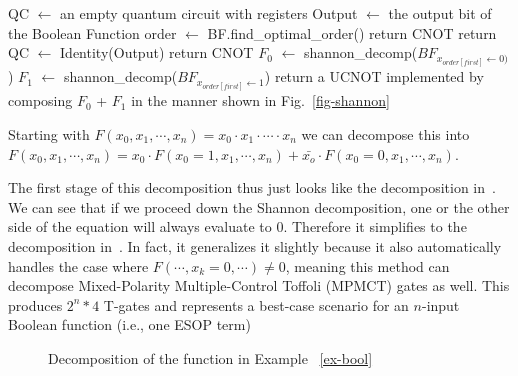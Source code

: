 \begin{algorithm}[tbp]
  \caption{shannon\_decomp(BF: a Boolean function)}
  \label{algo-shannon}
  \begin{algorithmic}
    \State QC $\leftarrow$ an empty quantum circuit with registers
    \State Output $\leftarrow$ the output bit of the Boolean Function
    \State order $\leftarrow$ BF.find\_optimal\_order()
    \State return CNOT
    \State return QC $\leftarrow$ Identity(Output)
    \State return CNOT
    \Else
    \State $F_0$ $\leftarrow$ shannon\_decomp($BF_{x_{order[first]}\leftarrow 0)}$)
    \State $F_1$ $\leftarrow$ shannon\_decomp($BF_{x_{order[first]}\leftarrow 1}$)
    \State return a UCNOT implemented by composing $F_0$ + $F_1$ in the manner shown in Fig.~\ref{fig-shannon}
    \EndIf
  \end{algorithmic}
  
\end{algorithm}

\begin{example}
  \label{ex-rtof}
  Starting with $F(x_0,x_1,\cdots,x_n) = x_0 \cdot x_1 \cdot \cdots \cdot x_n$ we can decompose this into $F(x_0,x_1,\cdots,x_n) = x_0 \cdot F(x_0=1,x_1,\cdots,x_n) + \bar{x_o} \cdot F(x_0=0,x_1,\cdots,x_n)$.

  The first stage of this decomposition thus just looks like the decomposition in~\cite{bib-rtof-maslov}. We can see that if we proceed down the Shannon decomposition, one or the other side of the equation will always evaluate to 0. Therefore it simplifies to the decomposition in~\cite{bib-amy-phase-state}. In fact, it generalizes it slightly because it also automatically handles the case where $F(\cdots , x_k=0 , \cdots) \neq 0$, meaning this method can decompose Mixed-Polarity Multiple-Control Toffoli (MPMCT) gates as well.
  This produces $2^n * 4$ T-gates and represents a best-case scenario for an $n$-input Boolean function (i.e., one ESOP term)
\end{example}

\begin{figure}[t]
  \begin{minipage}{\linewidth}
      \begin{center}
        
      \end{center}
      \caption{Decomposition of the function in Example ~\ref{ex-bool}}
      \label{fig-func-decomp}
  \end{minipage}
\end{figure}

